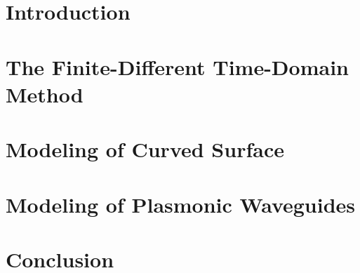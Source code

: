 \documentclass{book}
\begin{document}
\pagestyle{plain}
\fontsize{12}{2em}\selectfont





\tableofcontents



\chapter{Introduction}







\chapter{The Finite-Different Time-Domain Method}










\chapter{Modeling of Curved Surface}



\chapter{Modeling of Plasmonic Waveguides}



\chapter{Conclusion}
\end{document}
